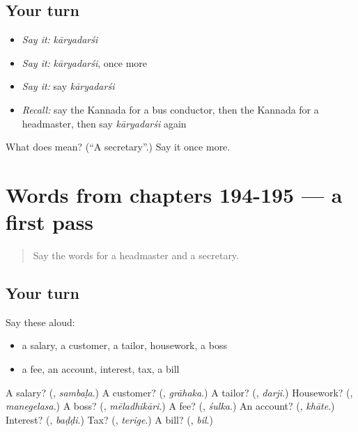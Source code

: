 \subsection*{Your turn}
\begin{itemize}
\raggedright
  \item \emph{Say it:} \emph{kāryadarśi}
  \item \emph{Say it:} \emph{kāryadarśi}, once more
  \item \emph{Say it:} say \emph{kāryadarśi}
  \item \emph{Recall:} say the Kannada for a bus conductor, then the Kannada for a headmaster, then say \emph{kāryadarśi} again
\end{itemize}

\begin{tcolorbox}[breakable,colback=teal!4,colframe=teal!35!black,title={Before you move on}]
What does  mean? (\textquotedblleft{}A secretary\textquotedblright{}.) Say it once more.
\end{tcolorbox}
\section[(dialogue)]{Words from chapters 194-195 — a first pass}

\label{lesson:KA-R197-first-pass-words-from-chapters-194-195}



\begin{quote}
Say the words for a headmaster and a secretary.
\end{quote}

\subsection*{Your turn}
Say these aloud:

\begin{itemize}
\raggedright
  \item a salary, a customer, a tailor, housework, a boss
  \item a fee, an account, interest, tax, a bill
\end{itemize}

\begin{tcolorbox}[breakable,colback=teal!4,colframe=teal!35!black,title={Before you move on}]
A salary? (\textbf{}, \emph{sambaḷa}.) A customer? (\textbf{}, \emph{grāhaka}.) A tailor? (\textbf{}, \emph{darji}.) Housework? (\textbf{}, \emph{manegelasa}.) A boss? (\textbf{}, \emph{mēladhikāri}.) A fee? (\textbf{}, \emph{śulka}.) An account? (\textbf{}, \emph{khāte}.) Interest? (\textbf{}, \emph{baḍḍi}.) Tax? (\textbf{}, \emph{terige}.) A bill? (\textbf{}, \emph{bil}.)
\end{tcolorbox}

